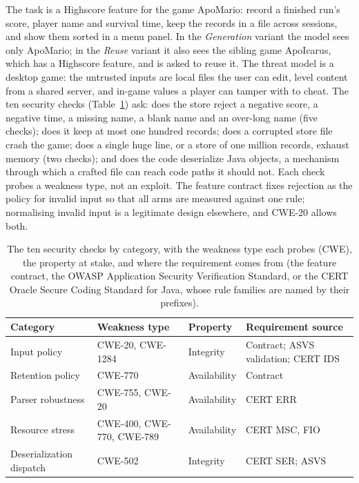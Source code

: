 The task is a Highscore feature for the game ApoMario: record a finished
run's score, player name and survival time, keep the records in a file
across sessions, and show them sorted in a menu panel. In the
\emph{Generation} variant the model sees only ApoMario; in the \emph{Reuse}
variant it also sees the sibling game ApoIcarus, which has a Highscore
feature, and is asked to reuse it. The threat model is a desktop game: the
untrusted inputs are local files the user can edit, level content from a
shared server, and in-game values a player can tamper with to cheat. The
ten security checks (Table~\ref{tab:mapping}) ask: does the store reject a
negative score, a negative time, a missing name, a blank name and an
over-long name (five checks); does it keep at most one hundred records;
does a corrupted store file crash the game; does a single huge line, or a
store of one million records, exhaust memory (two checks); and does the
code deserialize Java objects, a mechanism through which a crafted file can
reach code paths it should not. Each check probes a weakness type, not an
exploit. The feature contract fixes rejection as the policy for invalid
input so that all arms are measured against one rule; normalising invalid
input is a legitimate design elsewhere, and CWE-20 allows both.

\begin{table}[t]
\centering
\footnotesize
\setlength{\tabcolsep}{4pt}
\caption{The ten security checks by category, with the weakness type each probes (CWE), the property at stake, and where the requirement comes from (the feature contract, the OWASP Application Security Verification Standard, or the CERT Oracle Secure Coding Standard for Java, whose rule families are named by their prefixes).}
\label{tab:mapping}
\begin{tabular}{@{}llll@{}}
\toprule
Category & Weakness type & Property & Requirement source \\
\midrule
Input policy & CWE-20, CWE-1284 & Integrity & Contract; ASVS validation; CERT IDS \\
Retention policy & CWE-770 & Availability & Contract \\
Parser robustness & CWE-755, CWE-20 & Availability & CERT ERR \\
Resource stress & CWE-400, CWE-770, CWE-789 & Availability & CERT MSC, FIO \\
Deserialization dispatch & CWE-502 & Integrity & CERT SER; ASVS \\
\bottomrule
\end{tabular}
\end{table}
